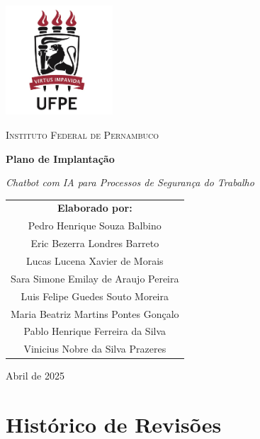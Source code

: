 \documentclass[12pt,a4paper]{article}
\begin{document}
\begin{titlepage}
    \thispagestyle{empty}
    \centering
    \vspace*{0.5cm}
    {\includegraphics[width=4cm]{images/UFPE.jpg}\par}
    \vspace{1cm}
    {\scshape\LARGE Instituto Federal de Pernambuco \par}
    \vspace{1.5cm}
    {\huge\bfseries Plano de Implantação \par}
    \vspace{1cm}
    {\Large\itshape Chatbot com IA para Processos de Segurança do Trabalho\par}
    \vfill
    \begin{center}
    \begin{tabular}{c}
        {\large \textbf{Elaborado por:}}\\[0.5cm]
        Pedro Henrique Souza Balbino\\
        Eric Bezerra Londres Barreto\\
        Lucas Lucena Xavier de Morais\\
        Sara Simone Emilay de Araujo Pereira\\
        Luis Felipe Guedes Souto Moreira\\
        Maria Beatriz Martins Pontes Gonçalo\\
        Pablo Henrique Ferreira da Silva\\
        Vinicius Nobre da Silva Prazeres
    \end{tabular}
    \end{center}
    \vfill
    {\large Abril de 2025\par}
\end{titlepage}

\newpage
\thispagestyle{empty}
\section*{Histórico de Revisões}
\end{document}
